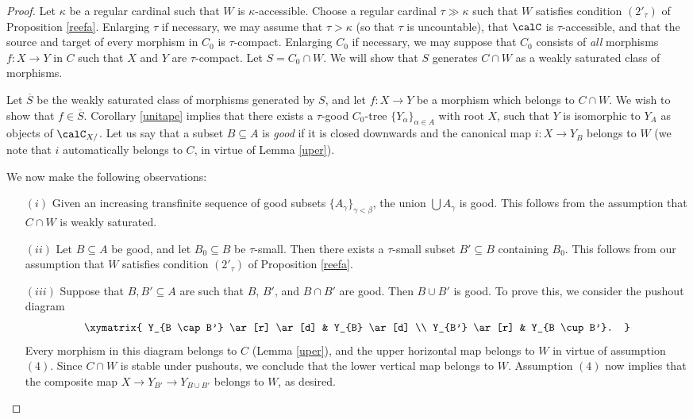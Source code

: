\begin{proof}
Let $\kappa$ be a regular cardinal such that $W$ is $\kappa$-accessible. Choose a regular cardinal $\tau \gg \kappa$ such that $W$ satisfies condition $(2'_{\tau})$ of Proposition \ref{reefa}. Enlarging $\tau$ if necessary, we may assume that $\tau > \kappa$ (so that $\tau$ is uncountable), that $\calC$ is $\tau$-accessible, and that the source and target of every morphism in $C_0$ is 
$\tau$-compact. Enlarging $C_0$ if necessary, we may suppose that $C_0$ consists of {\em all} morphisms $f: X \rightarrow Y$ in $C$ such that $X$ and $Y$ are $\tau$-compact. Let $S = C_0 \cap W$. We will show that $S$ generates $C \cap W$ as a weakly saturated class of morphisms.

Let $\overline{S}$ be the weakly saturated class of morphisms generated by $S$, and let
$f: X \rightarrow Y$ be a morphism which belongs to $C \cap W$. We wish to show that $f \in \overline{S}$. Corollary \ref{unitape} implies that there exists a $\tau$-good $C_0$-tree $\{ Y_{\alpha} \}_{\alpha \in A}$ with root $X$, such that
$Y$ is isomorphic to $Y_{A}$ as objects of $\calC_{X/}$. Let us say that a subset $B \subseteq A$ is {\it good} if it is closed downwards and the canonical map $i: X \rightarrow Y_{B}$ belongs to $W$ (we note that $i$ automatically belongs to $C$, in virtue of Lemma \ref{uper}). 

We now make the following observations:
\begin{itemize}
\item[$(i)$] Given an increasing transfinite sequence of good subsets $\{ A_{\gamma} \}_{\gamma < \beta}$,
the union $\bigcup A_{\gamma}$ is good. This follows from the assumption that $C \cap W$
is weakly saturated.
\item[$(ii)$] Let $B \subseteq A$ be good, and let $B_0 \subseteq B$ be $\tau$-small. Then there exists a $\tau$-small subset $B' \subseteq B$ containing $B_0$. This follows from our assumption
that $W$ satisfies condition $(2'_{\tau})$ of Proposition \ref{reefa}. 
\item[$(iii)$] Suppose that $B,B' \subseteq A$ are such that $B$, $B'$, and $B \cap B'$ are good.
Then $B \cup B'$ is good. To prove this, we consider the pushout diagram
$$ \xymatrix{ Y_{B \cap B'} \ar[r] \ar[d] & Y_{B} \ar[d] \\
Y_{B'} \ar[r] & Y_{B \cup B'}. }$$
Every morphism in this diagram belongs to $C$ (Lemma \ref{uper}), and the upper horizontal map belongs to $W$ in virtue of assumption $(4)$. Since $C \cap W$ is stable under pushouts, we conclude that the lower vertical map belongs to $W$. Assumption $(4)$ now implies that the composite map $X \rightarrow Y_{B'} \rightarrow Y_{B \cup B'}$ belongs to $W$, as desired.
\end{itemize}


\end{proof}
